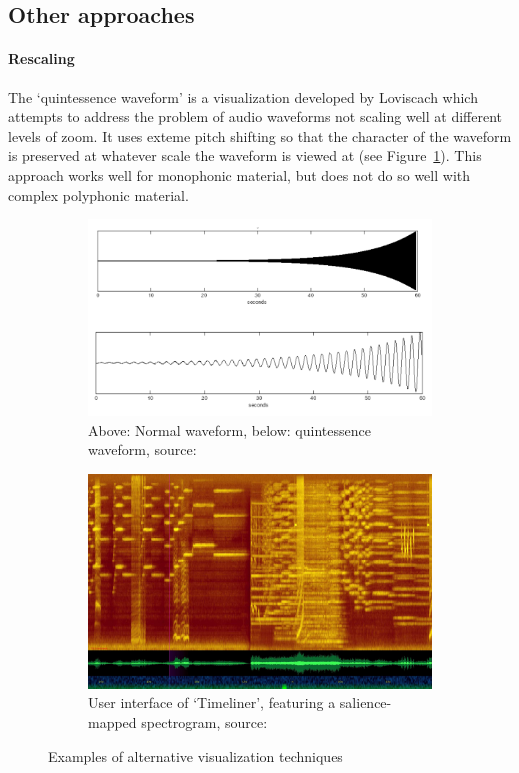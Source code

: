 \subsection{Other approaches}

\paragraph{Rescaling}
The `quintessence waveform' is a visualization developed by Loviscach
\cite{Loviscach2011} which attempts to address the problem of audio waveforms
not scaling well at different levels of zoom. It uses exteme pitch shifting so
that the character of the waveform is preserved at whatever scale the waveform
is viewed at (see Figure~\ref{fig:quint}). This approach works well for
monophonic material, but does not do so well with complex polyphonic material.

\begin{figure}[ht]
\centering
\begin{subfigure}{.5\textwidth}
  \centering
  \includegraphics[width=0.95\linewidth]{figs/quint.png}
  \caption{Above: Normal waveform, below: quintessence waveform, source:
  \cite{Loviscach2011}}
  \label{fig:quint}
\end{subfigure}%
\begin{subfigure}{.5\textwidth}
  \centering
  \includegraphics[width=0.95\linewidth]{figs/timeliner.png}
  \caption{User interface of `Timeliner', featuring a salience-mapped
    spectrogram, source: \cite{Goudeseune2012}}
  \label{fig:timeliner}
\end{subfigure}
  \caption{Examples of alternative visualization techniques}
\label{fig:altvis}
\end{figure}

